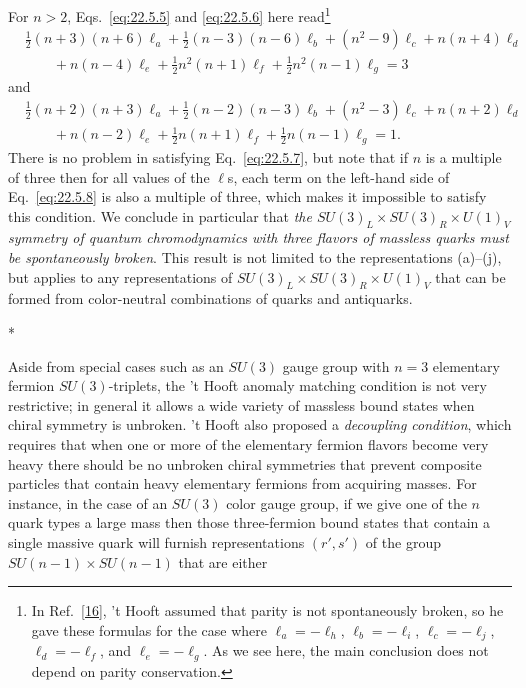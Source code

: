 For $n>2$, Eqs.~\eqref{eq:22.5.5} and \eqref{eq:22.5.6} here
read\footnote{In Ref.~\hyperref[ch22-ref-16]{[16]}, 't Hooft assumed that
parity is not spontaneously broken, so he gave these formulas for the case
where $\ell_a=-\ell_h$, $\ell_b=-\ell_i$, $\ell_c=-\ell_j$,
$\ell_d=-\ell_f$, and $\ell_e=-\ell_g$. As we see here, the main
conclusion does not depend on parity conservation.}
\begin{equation}
 \begin{aligned}
 &\frac{1}{2}(n+3)(n+6)\ell_a
 +\frac{1}{2}(n-3)(n-6)\ell_b
 +(n^2-9)\ell_c+n(n+4)\ell_d\\
 &\qquad
 +n(n-4)\ell_e
 +\frac{1}{2}n^2(n+1)\ell_f
 +\frac{1}{2}n^2(n-1)\ell_g=3
 \end{aligned}
 \tag{22.5.7}\label{eq:22.5.7}
\end{equation}
and
\begin{equation}
 \begin{aligned}
 &\frac{1}{2}(n+2)(n+3)\ell_a
 +\frac{1}{2}(n-2)(n-3)\ell_b
 +(n^2-3)\ell_c+n(n+2)\ell_d\\
 &\qquad
 +n(n-2)\ell_e
 +\frac{1}{2}n(n+1)\ell_f
 +\frac{1}{2}n(n-1)\ell_g=1.
 \end{aligned}
 \tag{22.5.8}\label{eq:22.5.8}
\end{equation}
There is no problem in satisfying Eq.~\eqref{eq:22.5.7}, but note that if
$n$ is a multiple of three then for all values of the $\ell$s, each term
on the left-hand side of Eq.~\eqref{eq:22.5.8} is also a multiple of three,
which makes it impossible to satisfy this condition. We conclude in
particular that \emph{the $SU(3)_L\times SU(3)_R\times U(1)_V$ symmetry of
quantum chromodynamics with three flavors of massless quarks must be
spontaneously broken}. This result is not limited to the representations
(a)--(j), but applies to any representations of
$SU(3)_L\times SU(3)_R\times U(1)_V$ that can be formed from color-neutral
combinations of quarks and antiquarks.

\begin{center}
* \quad * \quad *
\end{center}

Aside from special cases such as an $SU(3)$ gauge group with $n=3$
elementary fermion $SU(3)$-triplets, the 't Hooft anomaly matching
condition is not very restrictive; in general it allows a wide variety of
massless bound states when chiral symmetry is unbroken. 't Hooft also
proposed a \emph{decoupling condition}, which requires that when one or
more of the elementary fermion flavors become very heavy there should be
no unbroken chiral symmetries that prevent composite particles that contain
heavy elementary fermions from acquiring masses. For instance, in the case
of an $SU(3)$ color gauge group, if we give one of the $n$ quark types a
large mass then those three-fermion bound states that contain a single
massive quark will furnish representations $(r',s')$ of the group
$SU(n-1)\times SU(n-1)$ that are either

